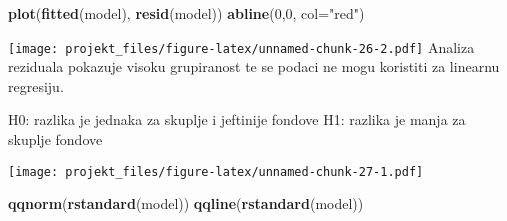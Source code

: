 \documentclass[
]{article}
\newenvironment{Shaded}{\begin{snugshade}}{\end{snugshade}}
\newcommand{\DataTypeTok}[1]{\textcolor[rgb]{0.13,0.29,0.53}{#1}}
\newcommand{\DecValTok}[1]{\textcolor[rgb]{0.00,0.00,0.81}{#1}}
\newcommand{\KeywordTok}[1]{\textcolor[rgb]{0.13,0.29,0.53}{\textbf{#1}}}
\newcommand{\NormalTok}[1]{#1}
\newcommand{\OperatorTok}[1]{\textcolor[rgb]{0.81,0.36,0.00}{\textbf{#1}}}
\newcommand{\StringTok}[1]{\textcolor[rgb]{0.31,0.60,0.02}{#1}}
\begin{document}
\begin{Shaded}
\begin{Highlighting}[]
\KeywordTok{plot}\NormalTok{(}\KeywordTok{fitted}\NormalTok{(model), }\KeywordTok{resid}\NormalTok{(model))}
\KeywordTok{abline}\NormalTok{(}\DecValTok{0}\NormalTok{,}\DecValTok{0}\NormalTok{, }\DataTypeTok{col=}\StringTok{"red"}\NormalTok{)}
\end{Highlighting}
\end{Shaded}

\texttt{[image: projekt\_files/figure-latex/unnamed-chunk-26-2.pdf]}
Analiza reziduala pokazuje visoku grupiranost te se podaci ne mogu
koristiti za linearnu regresiju.

H0: razlika je jednaka za skuplje i jeftinije fondove H1: razlika je
manja za skuplje fondove

\begin{Shaded}
\end{Shaded}

\texttt{[image: projekt\_files/figure-latex/unnamed-chunk-27-1.pdf]}

\begin{Shaded}
\begin{Highlighting}[]
\KeywordTok{qqnorm}\NormalTok{(}\KeywordTok{rstandard}\NormalTok{(model))}
\KeywordTok{qqline}\NormalTok{(}\KeywordTok{rstandard}\NormalTok{(model))}
\end{Highlighting}
\end{Shaded}
\end{document}
